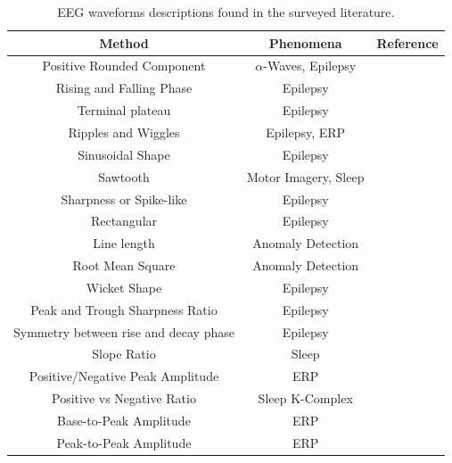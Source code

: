 \documentclass[brainsci,article,accept,moreauthors,pdftex,10pt,a4paper]{mdpi}
\begin{document}
\begin{table}[H]
\caption{EEG waveforms descriptions found in the surveyed literature.}
\centering
\begin{tabular}{ccc}
\toprule
\textbf{Method}	& \textbf{Phenomena} & \textbf{Reference}	\\
\midrule
Positive Rounded Component                    & $\alpha$-Waves, Epilepsy & \citep{Schomer2010,Tatum2008} \\
Rising and Falling Phase      & Epilepsy &  \citep{Thakor2004,Tatum2008} \\
Terminal plateau      & Epilepsy &  \citep{Thakor2004} \\
Ripples and Wiggles     & Epilepsy, ERP &  \citep{EEGIntro, Thakor2004,Cacioppo2007,Kappenman2012} \\
Sinusoidal Shape        & Epilepsy &  \citep{Cacioppo2007,Tatum2008,Ouyang2017,Kappenman2012,Cole2017} \\
Sawtooth                     & Motor Imagery, Sleep &  \citep{EEGIntro,Rodenbeck2006,Tatum2008} \\
Sharpness or Spike-like     & Epilepsy &  \citep{Thakor2004,Hartman2005,Sanei2007,EEGIntro} \\
Rectangular     & Epilepsy &  \citep{Thakor2004,Cole2017} \\
Line length       & Anomaly Detection & \citep{Wulsin2011} \\
Root Mean Square & Anomaly Detection & \citep{Wulsin2011} \\
Wicket Shape     & Epilepsy &  \citep{EEGIntro,Hartman2005,Sanei2007,Tatum2008,Schomer2010,Cole2017} \\
Peak and Trough Sharpness Ratio     & Epilepsy &  \citep{Hartman2005,Sanei2007,Lawrence2010,Cole2017} \\
Symmetry between rise and decay phase     & Epilepsy &  \citep{Hartman2005,Cole2017} \\
Slope Ratio    & Sleep &  \citep{Subha2010} \\
Positive/Negative Peak Amplitude & ERP & \citep{Thakor2004,Hartman2005,Tatum2008,Mak2012,MullerPutz2015,Cole2017} \\
Positive vs Negative Ratio    & Sleep K-Complex &  \citep{EEGIntro} \\
Base-to-Peak Amplitude     & ERP  &  \citep{Cole2017} \\
Peak-to-Peak Amplitude     & ERP  &  \citep{Wulsin2011,Mak2012} \\

\end{tabular}
\end{table}
\end{document}
